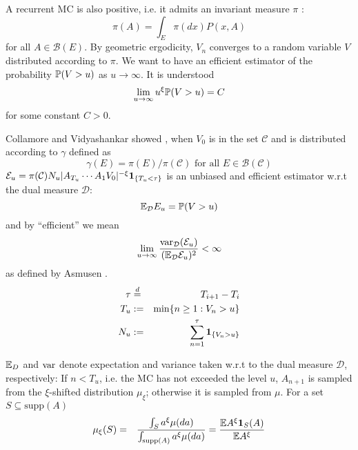 \documentclass{beamer}
\begin{document}
\begin{frame}
  A recurrent MC is also positive, i.e. it admits an invariant
  measure $\pi$ \cite{Meyn:2009:MCS:1550713}:
  \[
  \pi(A) = \int_E \pi(dx) P(x, A)
  \]
  for all $A \in \mathcal B(E)$.
  By geometric ergodicity, $V_n$ converges to a random variable $V$
  distributed according to $\pi$. We want to have an efficient estimator of the
  probability $\P(V > u)$ as $u \to \infty$. It is understood
  \[
   \lim_{u \to \infty} u^\xi \P(V > u) = C
  \]
  for some constant $C > 0$.
\end{frame}

\begin{frame}
  Collamore and Vidyashankar showed \cite{collamore2014}, when
  $V_0$ is in the set $\mathcal C$ and is distributed according to
  $\gamma$ defined as
  \[
  \gamma(E) = \pi(E)/\pi(\mathcal C)\text{ for all } E \in \mathcal B(\mathcal C)
  \]
  $\mathcal E_u = \pi(\mathcal C) N_u |A_{T_u} \cdots A_{1}
  V_0|^{-\xi}\1{T_u < \tau}$ is an unbiased and efficient estimator
  w.r.t the dual measure $\mathcal D$:
  \[
  \E_{\mathcal D} E_u = \P(V > u)
  \]
  and by ``efficient'' we mean
  \[
  \lim_{u \to \infty} {
    \var_{\mathcal D}(\mathcal E_u)
    \over
    (\E_{\mathcal D} \mathcal E_u)^2
  } < \infty
  \]
  as defined by Asmusen \cite{opac-b1123521}.
  \begin{eqnarray*}
    \tau &\overset{d}{=}& T_{i+1} - T_i \\
    T_u &:=& \min\{n \geq 1: V_n > u\} \\
    N_u &:=& \sum_{n=1}^{\tau} \1{V_n > u}
  \end{eqnarray*}
\end{frame}

\begin{frame}
  $\E_D$ and $\var$ denote expectation and variance taken w.r.t to the
  dual measure $\mathcal D$, respectively: If $n < T_u$, i.e. the MC
  has not exceeded the level $u$, $A_{n+1}$ is sampled from the
  $\xi$-shifted distribution $\mu_\xi$; otherwise it is sampled from
  $\mu$. For a set $S \subseteq \text{supp}(A)$
  \begin{eqnarray*}
    \mu_\xi (S) &=& {
      \int_{S} a^\xi \mu(da)
      \over
      \int_{\text{supp}(A)} a^\xi \mu(da)
    } = {\E A^\xi \I{S}(A)
    \over
    \E A^\xi
    }
  \end{eqnarray*}
\end{frame}
\end{document}

